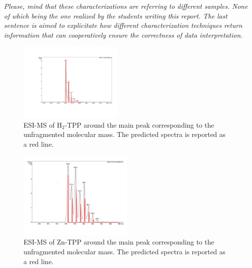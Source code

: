 \documentclass[twoside,twocolumn,9pt]{article}
\begin{document}
\textit{Please, mind that these characterizations are referring to different samples. None of which being the one realized by the students writing this report.
The last sentence is aimed to explicitate how different characterization techniques return information that can cooperatively ensure the correctness of data interpretation.}
\begin{figure}
	\centering
	\includegraphics[width=0.45\textwidth]{ESI-MS-H2-TPP}
	\caption{ESI-MS of H$_{2}$-TPP around the main peak corresponding to the unfragmented molecular mass. The predicted spectra is reported as a red line.}
	\label{ESI-MS-H2-TPP}
\end{figure}
\begin{figure}
	\centering
	\includegraphics[width=0.5\textwidth]{ESI-MS-Zn-TPP}
	\caption{ESI-MS of Zn-TPP around the main peak corresponding to the unfragmented molecular mass. The predicted spectra is reported as a red line.}
	\label{ESI-MS-Zn-TPP}
\end{figure}
\end{document}
